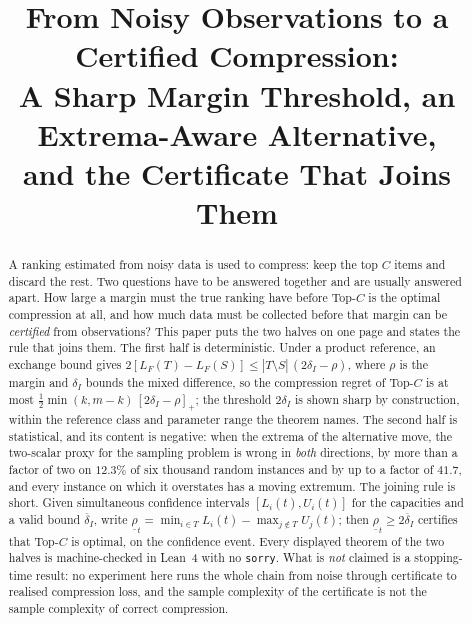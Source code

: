 



\title{From Noisy Observations to a Certified Compression:\\
A Sharp Margin Threshold, an Extrema-Aware Alternative,\\
and the Certificate That Joins Them}

\author{
}

\maketitle

\begin{abstract}
A ranking estimated from noisy data is used to compress: keep the top $C$ items and
discard the rest. Two questions have to be answered together and are usually answered apart.
How large a margin must the true ranking have before Top-$C$ is the optimal compression at
all, and how much data must be collected before that margin can be \emph{certified} from
observations? This paper puts the two halves on one page and states the rule that joins them.
The first half is deterministic. Under a product reference, an exchange bound gives
$2[L_{F}(T)-L_{F}(S)]\le|T\setminus S|\,(2\delta_{I}-\rho)$, where $\rho$ is the margin and
$\delta_{I}$ bounds the mixed difference, so the compression regret of Top-$C$ is at most
$\tfrac12\min(k,m-k)\,[2\delta_{I}-\rho]_{+}$; the threshold $2\delta_{I}$ is shown sharp by
construction, within the reference class and parameter range the theorem names. The second
half is statistical, and its content is negative: when the extrema of the alternative move,
the two-scalar proxy for the sampling problem is wrong in \emph{both} directions, by more
than a factor of two on $12.3\%$ of six thousand random instances and by up to a factor of
$41.7$, and every instance on which it overstates has a moving extremum. The joining rule is
short. Given simultaneous confidence intervals $[L_{i}(t),U_{i}(t)]$ for the capacities and a
valid bound $\overline{\delta}_{I}$, write
$\underline{\rho}_{t}=\min_{i\in T}L_{i}(t)-\max_{j\notin T}U_{j}(t)$; then
$\underline{\rho}_{t}\ge2\overline{\delta}_{I}$ certifies that Top-$C$ is optimal, on the
confidence event. Every displayed theorem of the two halves is machine-checked in Lean~4 with
no \texttt{sorry}. What is \emph{not} claimed is a stopping-time result: no experiment here
runs the whole chain from noise through certificate to realised compression loss, and the
sample complexity of the certificate is not the sample complexity of correct compression.
\end{abstract}

